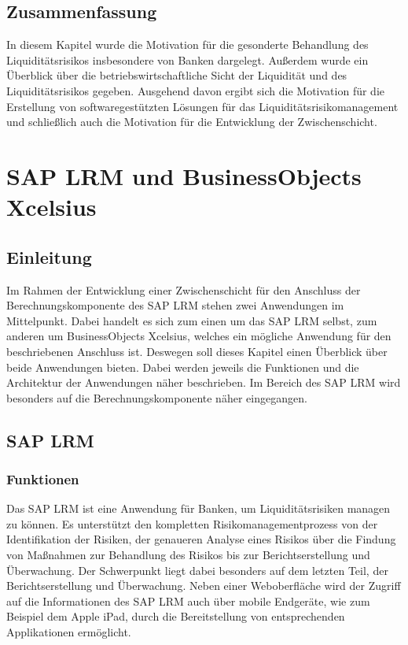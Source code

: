 \begin{onehalfspacing}
\section{Zusammenfassung}
In diesem Kapitel wurde die Motivation für die gesonderte Behandlung des Liquiditätsrisikos insbesondere von Banken dargelegt. Außerdem wurde ein Überblick über die betriebswirtschaftliche Sicht der Liquidität und des Liquiditätsrisikos gegeben. Ausgehend davon ergibt sich die Motivation für die Erstellung von softwaregestützten Lösungen für das Liquiditätsrisikomanagement und schließlich auch die Motivation für die Entwicklung der Zwischenschicht.

\chapter{SAP LRM und BusinessObjects Xcelsius} 

\section{Einleitung}
Im Rahmen der Entwicklung einer Zwischenschicht für den Anschluss der Berechnungskomponente des SAP LRM stehen zwei Anwendungen im Mittelpunkt. Dabei handelt es sich zum einen um das SAP LRM selbst, zum anderen um BusinessObjects Xcelsius, welches ein mögliche Anwendung für den beschriebenen Anschluss ist. Deswegen soll dieses Kapitel einen Überblick über beide Anwendungen bieten. Dabei werden jeweils die Funktionen und die Architektur der Anwendungen näher beschrieben. Im Bereich des SAP LRM wird besonders auf die Berechnungskomponente näher eingegangen.

\section{SAP LRM}

\subsection{Funktionen}
Das SAP LRM ist eine Anwendung für Banken, um Liquiditätsrisiken managen zu können. Es unterstützt den kompletten Risikomanagementprozess von der Identifikation der Risiken, der genaueren Analyse eines Risikos über die Findung von Maßnahmen zur Behandlung des Risikos bis zur Berichtserstellung und Überwachung. Der Schwerpunkt liegt dabei besonders auf dem letzten Teil, der Berichtserstellung und Überwachung. Neben einer Weboberfläche wird der Zugriff auf die Informationen des SAP LRM auch über mobile Endgeräte, wie zum Beispiel dem Apple iPad, durch die Bereitstellung von entsprechenden Applikationen ermöglicht.


\end{onehalfspacing}
